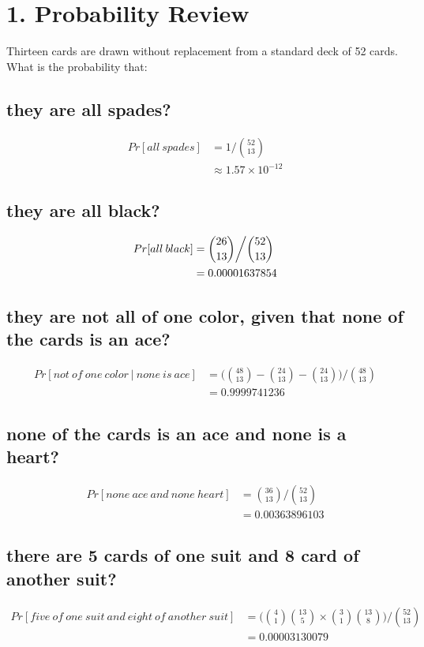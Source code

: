 \documentclass[10pt]{537homework}
\author{Peilun Dai}
\begin{document}
\section*{1. Probability Review }

Thirteen cards are drawn without replacement from a standard deck of 52 cards. What is the probability that:
\subsection{they are all spades?}

\begin{align}
		Pr [all\:spades]		& = 1 \Big / {52 \choose 13}\\ 
							& \approx 1.57 \times 10^{-12}
\end{align}


\subsection{they are all black?}

\begin{align}
	Pr [all\:black]		&= {26 \choose 13} \bigg{/} {52 \choose 13} \\
						& = 0.00001637854
\end{align}



\subsection{they are not all of one color, given that none of the cards is an ace?}

\begin{align}
	Pr [not\:of\:one\:color\:|\:none\:is\:ace] 	& = \Bigg({48 \choose 13} - {24 \choose 13} - {24 \choose 13}\Bigg) \Bigg/ {48 \choose 13} \\
												& = 0.9999741236
\end{align}


\subsection{none of the cards is an ace and none is a heart?}

\begin{align}
	Pr [none\:ace\:and\:none\:heart]		& = {36 \choose 13} \Bigg / {52 \choose 13} \\
										& = 0.00363896103
\end{align}


\subsection{there are 5 cards of one suit and 8 card of another suit?}

\begin{align}
	Pr [five\:of\:one\:suit\:and\:eight\:of\:another\:suit]	& = \Bigg( {4 \choose 1}{13 \choose 5} \times {3 \choose 1}{13 \choose 8} \Bigg) \Bigg/ {52 \choose 13} \\
	& = 0.00003130079
\end{align}
\end{document}

